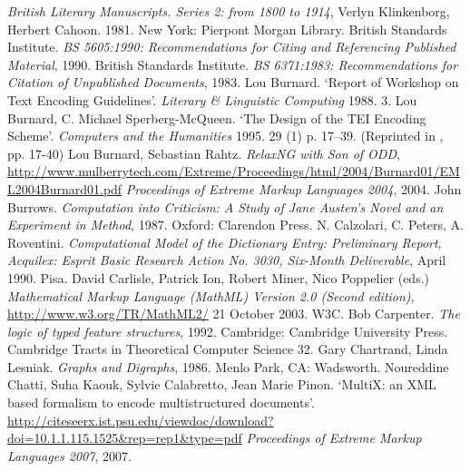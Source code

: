 \begin{bibitemlist}{1}
\label{KLINKENBORG}\textit{British Literary Manuscripts. Series 2: from 1800 to 1914}, Verlyn Klinkenborg, Herbert Cahoon. 1981. New York: Pierpont Morgan Library. 
\label{BS-5605}British Standards Institute. \textit{BS 5605:1990: Recommendations for Citing and Referencing Published Material}, 1990. 
\label{BS-6371}British Standards Institute. \textit{BS 6371:1983: Recommendations for Citation of Unpublished Documents}, 1983. 
\label{AB-eg-01}Lou Burnard. ‘Report of Workshop on Text Encoding Guidelines’. \textit{Literary \& Linguistic Computing} 1988. 3. 
\label{Burnard1995b}Lou Burnard, C. Michael Sperberg-McQueen. ‘The Design of the TEI Encoding Scheme’.  \textit{Computers and the Humanities} 1995. 29  (1)  p. 17–39.  (Reprinted in \cite{Ide1995b}, pp. 17-40)
\label{TD-BIBL-01}Lou Burnard, Sebastian Rahtz. \textit{RelaxNG with Son of ODD},  \url{http://www.mulberrytech.com/Extreme/Proceedings/html/2004/Burnard01/EML2004Burnard01.pdf} \textit{Proceedings of Extreme Markup Languages 2004}, 2004. 
\label{HD-BIBL-2}John Burrows. \textit{Computation into Criticism: A Study of Jane Austen's Novel and an Experiment in Method}, 1987. Oxford: Clarendon Press. 
\label{DI-BIBL-2}N. Calzolari, C. Peters, A. Roventini. \textit{Computational Model of the Dictionary Entry: Preliminary Report}, \textit{Acquilex: Esprit Basic Research Action No. 3030, Six-Month Deliverable}, April 1990. Pisa. 
\label{MATHML}David Carlisle, Patrick Ion, Robert Miner, Nico Poppelier (eds.) \textit{Mathematical Markup Language (MathML) Version 2.0 (Second edition)},  \url{http://www.w3.org/TR/MathML2/} 21 October 2003. W3C. 
\label{FS-BIBL-5}Bob Carpenter. \textit{The logic of typed feature structures}, 1992. Cambridge: Cambridge University Press. Cambridge Tracts in Theoretical Computer Science  32. 
\label{GD-BIBL-1}Gary Chartrand, Linda Lesniak. \textit{Graphs and Digraphs}, 1986. Menlo Park, CA: Wadsworth. 
\label{NH-BIBL-5}Noureddine Chatti, Suha Kaouk, Sylvie Calabretto, Jean Marie Pinon. ‘MultiX: an XML based formalism to encode multistructured documents’.  \url{http://citeseerx.ist.psu.edu/viewdoc/download?doi=10.1.1.115.1525\&rep=rep1\&type=pdf} \textit{Proceedings of Extreme Markup Languages 2007}, 2007. 

\end{bibitemlist}
